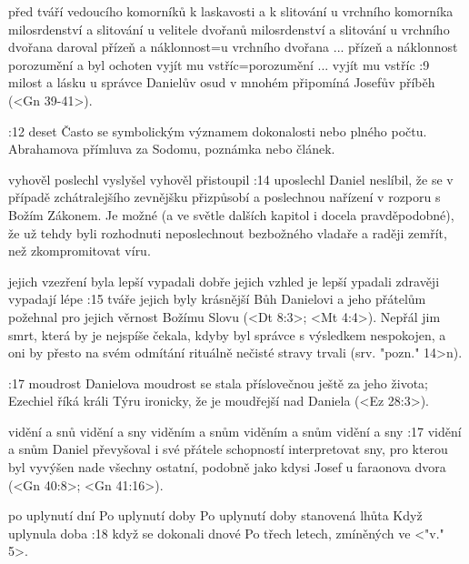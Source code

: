     {před tváří vedoucího komorníků k laskavosti a k slitování} %
    {u vrchního komorníka milosrdenství a slitování}  %
    {u velitele dvořanů milosrdenství a slitování} %
    {u vrchního dvořana daroval přízeň a náklonnost}={u vrchního dvořana ... přízeň a náklonnost}  %
    {porozumění a byl ochoten vyjít mu vstříc}={porozumění ... vyjít mu vstříc}  %
:9 {milost a lásku u správce} Danielův osud v mnohém připomíná Josefův příběh (<Gn 39-41>).

:12 {deset} Často se symbolickým významem dokonalosti nebo plného počtu. \dopsat  Abrahamova přímluva za Sodomu, poznámka nebo článek.

    {vyhověl} %
    {poslechl}  %
    {vyslyšel} %
    {vyhověl}  %
    {přistoupil}  %
:14 {uposlechl} Daniel neslíbil, že se v případě zchátralejšího zevnějšku přizpůsobí a poslechnou nařízení v rozporu s Božím Zákonem. Je možné (a ve světle dalších kapitol i docela pravděpodobné), že už tehdy byli rozhodnuti neposlechnout bezbožného vladaře a raději zemřít, než zkompromitovat víru.

    {jejich vzezření byla lepší} %
    {vypadali dobře}  %
    {jejich vzhled je lepší} %
    {ypadali zdravěji}  %
    {vypadají lépe}  %
:15 {tváře jejich byly krásnější} Bůh Danielovi a jeho přátelům požehnal pro jejich věrnost Božímu Slovu (<Dt 8:3>; <Mt 4:4>). Nepřál jim smrt, která by je nejspíše čekala, kdyby byl správce s výsledkem nespokojen, a oni by přesto na svém odmítání rituálně nečisté stravy trvali
(srv. \<"pozn." 14>n). 

:17 {moudrost} Danielova moudrost se stala příslovečnou ještě za jeho života; Ezechiel říká králi Týru ironicky, že je moudřejší nad Daniela (<Ez 28:3>). 

    {vidění a snů} %
    {vidění a sny}  %
    {viděním a snům} %
    {viděním a snům}  %
    {vidění a sny}  %
:17 {vidění a snům} Daniel převyšoval i své přátele schopností interpretovat sny, pro kterou byl vyvýšen nade všechny ostatní, podobně jako kdysi Josef u faraonova dvora (<Gn 40:8>; <Gn 41:16>). 

    {po uplynutí dní} %
    {Po uplynutí doby}  %
    {Po uplynutí doby} %
    {stanovená lhůta}  %
    {Když uplynula doba}  %
:18 {když se dokonali dnové} Po třech letech, zmíněných ve  <"v." 5>.

